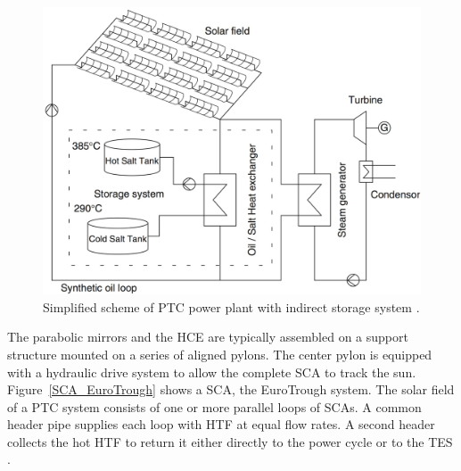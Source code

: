 \begin{figure}[htbp]  
\centering
\includegraphics[width=0.65\linewidth]{FIG/troughtindirecttwotank}
\caption[Simplified scheme of PTC power plant with indirect storage system.]{Simplified scheme of PTC power plant with indirect storage system \cite{Steinmann2012}.}\label{troughtindirecttwotank}
\end{figure}
The parabolic mirrors and the \ac{HCE} are typically assembled on a support structure mounted on a series of aligned pylons. The center pylon is equipped with a hydraulic drive system to allow the complete \ac{SCA} to track the sun. Figure~\ref{SCA_EuroTrough} shows a SCA, the EuroTrough system. The solar field of a PTC system consists of one or more parallel loops of \acp{SCA}. A common header pipe supplies each loop with \ac{HTF} at equal flow rates. A second header collects the hot \ac{HTF} to return it either directly to the power cycle or to the \ac{TES} \cite{Lupfert2013,Maccari2015}.


